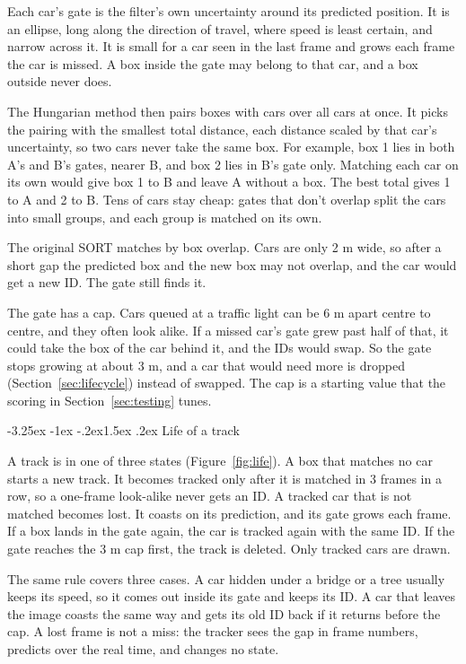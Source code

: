 \documentclass[11pt]{article}
\makeatletter
\renewcommand\subsection{\@startsection{subsection}{2}{\z@}%
  {-3.25ex \@plus -1ex \@minus -.2ex}{1.5ex \@plus .2ex}%
  {\normalfont\large\bfseries\color{accent}}}
\makeatother
\begin{document}
Each car's gate is the filter's own uncertainty around its predicted
position. It is an ellipse, long along the direction of travel, where speed
is least certain, and narrow across it. It is small for a car seen in the
last frame and grows each frame the car is missed. A box inside the gate may
belong to that car, and a box outside never does.

The Hungarian method then pairs boxes with cars over all cars at once. It
picks the pairing with the smallest total distance, each distance scaled by
that car's uncertainty, so two cars never take the same box. For example,
box 1 lies in both A's and B's gates, nearer B, and box 2 lies in B's gate
only. Matching each car on its own would give box 1 to B and leave A
without a box. The best total gives 1 to A and 2 to B. Tens of cars stay
cheap: gates that don't overlap split the cars into small groups, and each
group is matched on its own.

The original SORT matches by box overlap. Cars are only 2 m wide, so after
a short gap the predicted box and the new box may not overlap, and the car
would get a new ID. The gate still finds it.

The gate has a cap. Cars queued at a traffic light can be 6 m apart centre
to centre, and they often look alike. If a missed car's gate grew past half
of that, it could take the box of the car behind it, and the IDs would swap.
So the gate stops growing at about 3 m, and a car that would need more is
dropped (Section~\ref{sec:lifecycle}) instead of swapped. The cap is a
starting value that the scoring in Section~\ref{sec:testing} tunes.

\subsection{Life of a track}
\label{sec:lifecycle}

A track is in one of three states (Figure~\ref{fig:life}). A box that
matches no car starts a new track. It becomes tracked only after it is
matched in 3 frames in a row, so a one-frame look-alike never gets an ID. A
tracked car that is not matched becomes lost. It coasts on its prediction,
and its gate grows each frame. If a box lands in the gate again, the car is
tracked again with the same ID. If the gate reaches the 3 m cap first, the
track is deleted. Only tracked cars are drawn.

The same rule covers three cases. A car hidden under a bridge or a tree
usually keeps its speed, so it comes out inside its gate and keeps its ID.
A car that leaves the image coasts the same way and gets its old ID back if
it returns before the cap. A lost frame is not a miss: the tracker sees the
gap in frame numbers, predicts over the real time, and changes no state.
\end{document}
